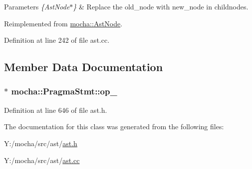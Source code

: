 \begin{DoxyParams}{Parameters}
{\em \{AstNode$\ast$\}} & Replace the old\_\-node with new\_\-node in childnodes. \\
\hline
\end{DoxyParams}


Reimplemented from \hyperlink{classmocha_1_1_ast_node_aa40396040f75fb59e320d81c3fd328c8}{mocha::AstNode}.



Definition at line 242 of file ast.cc.



\subsection{Member Data Documentation}
\hypertarget{classmocha_1_1_pragma_stmt_a0288cdef45eaad28d437536869332313}{
\subsubsection[{op\_\-}]{$\ast$ {\bf mocha::PragmaStmt::op\_\-}}}
\label{classmocha_1_1_pragma_stmt_a0288cdef45eaad28d437536869332313}


Definition at line 646 of file ast.h.



The documentation for this class was generated from the following files:\begin{DoxyCompactItemize}
\item 
Y:/mocha/src/ast/\hyperlink{ast_8h}{ast.h}\item 
Y:/mocha/src/ast/\hyperlink{ast_8cc}{ast.cc}\end{DoxyCompactItemize}
